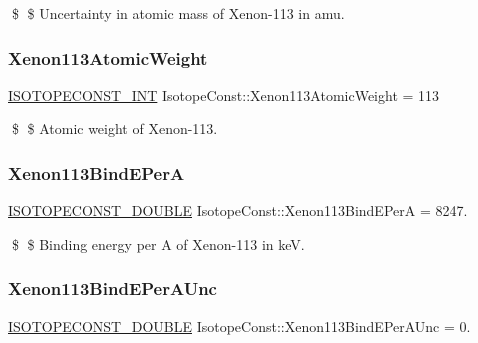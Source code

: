 \$ \$ Uncertainty in atomic mass of Xenon-\/113 in amu. \mbox{\label{group___isotope_const-_xenon-_xe113_gacc9de7c62ce783f7d5957fcdd9b354b3}} 
\subsubsection{\texorpdfstring{Xenon113\+Atomic\+Weight}{Xenon113AtomicWeight}}
{\footnotesize\ttfamily \mbox{\hyperlink{group___isotope_const-_macros_ga5f18360b3e99483a35c32d789e62621c}{I\+S\+O\+T\+O\+P\+E\+C\+O\+N\+S\+T\+\_\+\+I\+NT}} Isotope\+Const\+::\+Xenon113\+Atomic\+Weight = 113}

\$ \$ Atomic weight of Xenon-\/113. \mbox{\label{group___isotope_const-_xenon-_xe113_ga8af36eba683d316bc5debbd098a70428}} 
\subsubsection{\texorpdfstring{Xenon113\+Bind\+E\+PerA}{Xenon113BindEPerA}}
{\footnotesize\ttfamily \mbox{\hyperlink{group___isotope_const-_macros_ga8f45a7272ce02c0b4c65c44636ed719a}{I\+S\+O\+T\+O\+P\+E\+C\+O\+N\+S\+T\+\_\+\+D\+O\+U\+B\+LE}} Isotope\+Const\+::\+Xenon113\+Bind\+E\+PerA = 8247.}

\$ \$ Binding energy per A of Xenon-\/113 in keV. \mbox{\label{group___isotope_const-_xenon-_xe113_gae1693ad288a925e8fc364d08fc0cfe46}} 
\subsubsection{\texorpdfstring{Xenon113\+Bind\+E\+Per\+A\+Unc}{Xenon113BindEPerAUnc}}
{\footnotesize\ttfamily \mbox{\hyperlink{group___isotope_const-_macros_ga8f45a7272ce02c0b4c65c44636ed719a}{I\+S\+O\+T\+O\+P\+E\+C\+O\+N\+S\+T\+\_\+\+D\+O\+U\+B\+LE}} Isotope\+Const\+::\+Xenon113\+Bind\+E\+Per\+A\+Unc = 0.}

